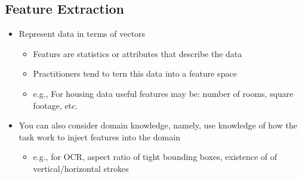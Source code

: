 \subsection{Feature Extraction}
\begin{itemize}
	\item Represent data in terms of vectors
	\begin{itemize}
		\item Featurs are statistics or attributes that describe the data
		\item Practitioners tend to tern this data into a feature space
		\item e.g., For housing data useful features may be: number of rooms, square footage, etc.
	\end{itemize}
	\item You can also consider domain knowledge, namely, use knowledge of how the task work to inject features into the domain
	\begin{itemize}
		\item e.g., for OCR, aspect ratio of tight bounding boxes, existence of of vertical/horizontal strokes
	\end{itemize}
\end{itemize}
